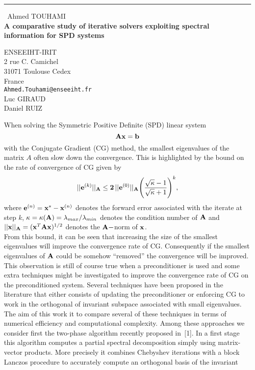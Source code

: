 \documentclass{report}
\begin{document}
\begin{center}
\rule{6in}{1pt} \
{\large Ahmed TOUHAMI \\
{\bf A comparative study of iterative solvers exploiting spectral information for SPD systems}}

ENSEEIHT-IRIT \\ 2 rue C. Camichel \\ 31071 Toulouse Cedex \\ France
\\
{\tt Ahmed.Touhami@enseeiht.fr}\\
Luc GIRAUD\\
Daniel RUIZ\end{center}

When solving the Symmetric Positive Definite (SPD) linear system
$${\bf A x}= {\bf b} $$
with the Conjugate Gradient (CG) method, the smallest eigenvalues of the
matrix $A$ often slow down the convergence.
This is highlighted by the bound on the rate of convergence of CG given by
$$ ||{\bf e}^{(k)}||_{\bf A} \le {\bf 2}\,||{\bf e}^{(0)}||_{\bf A}
\displaystyle\Bigg(\frac{\sqrt \kappa -1}{\sqrt \kappa + 1}\Bigg)^k,$$
where ${\bf e}^{(n)}= {\bf x}^* - {\bf x}^{(n)}$ denotes the forward
error associated with the iterate at step $k$, $\displaystyle \kappa =
\kappa({\bf A}) = \lambda_{max} / \lambda_{min}$ denotes the condition
number of ${\bf A}$ and $||{\bf x}||_{{\bf A}} = ({\bf x}^T{\bf A}{\bf
x})^{1/2}$ denotes the ${\bf A-}$norm of ${\bf x}$. \\
From this bound, it can be seen that increasing the size of the smallest
eigenvalues will improve the convergence rate of CG.
Consequently if the smallest eigenvalues of ${\bf A}$ could be somehow
``removed'' the convergence will be improved.
This observation is still of course true when a preconditioner is used and some
extra techniques might be investigated to improve the convergence rate of
CG on the preconditioned system.
Several techniques have been proposed in the literature that either consists of
updating the preconditioner or enforcing CG to work in the orthogonal of
invariant subspace associated with small eigenvalues.
The aim of this work it to compare several of these techniques in terms
of numerical efficiency and computational complexity.
Among these approaches we consider first the two-phase algorithm recently
proposed in~[1].
In a first stage this algorithm computes a partial spectral decomposition
simply using matrix-vector products.
More precisely it combines Chebyshev iterations with a block Lanczos
procedure to accurately compute an orthogonal basis of the invariant
\end{document}
